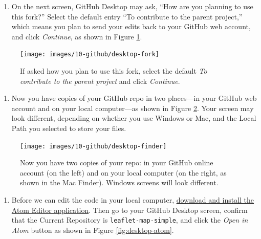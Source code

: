 \documentclass[
  english,
]{book}
\providecommand{\tightlist}{%
  \setlength{\itemsep}{0pt}\setlength{\parskip}{0pt}}
\begin{document}
\begin{enumerate}
\def\labelenumi{\arabic{enumi}.}
\setcounter{enumi}{5}
\tightlist
\item
  On the next screen, GitHub Desktop may ask, ``How are you planning to use this fork?'' Select the default entry ``To contribute to the parent project,'' which means you plan to send your edits back to your GitHub web account, and click \emph{Continue}, as shown in Figure \ref{fig:desktop-fork}.
\end{enumerate}



\begin{figure}
\texttt{[image: images/10-github/desktop-fork]} \caption{If asked how you plan to use this fork, select the default \emph{To contribute to the parent project} and click \emph{Continue}.}\label{fig:desktop-fork}
\end{figure}

\begin{enumerate}
\def\labelenumi{\arabic{enumi}.}
\setcounter{enumi}{6}
\tightlist
\item
  Now you have copies of your GitHub repo in two places---in your GitHub web account and on your local computer---as shown in Figure \ref{fig:desktop-finder}. Your screen may look different, depending on whether you use Windows or Mac, and the Local Path you selected to store your files.
\end{enumerate}



\begin{figure}
\texttt{[image: images/10-github/desktop-finder]} \caption{Now you have two copies of your repo: in your GitHub online account (on the left) and on your local computer (on the right, as shown in the Mac Finder). Windows screens will look different.}\label{fig:desktop-finder}
\end{figure}

\begin{enumerate}
\def\labelenumi{\arabic{enumi}.}
\setcounter{enumi}{7}
\tightlist
\item
  Before we can edit the code in your local computer, \href{https://atom.io}{download and install the Atom Editor application}. Then go to your GitHub Desktop screen, confirm that the Current Repository is \texttt{leaflet-map-simple}, and click the \emph{Open in Atom} button as shown in Figure \ref{fig:desktop-atom}.
\end{enumerate}
\end{document}

